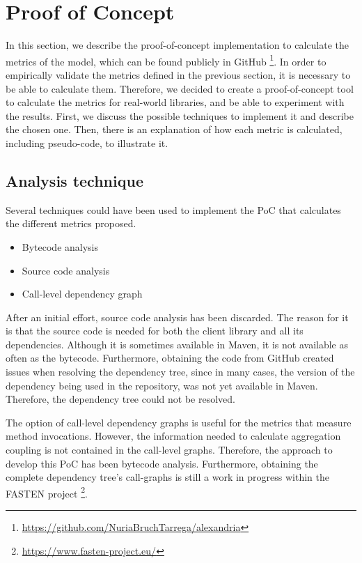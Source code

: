 \chapter{Proof of Concept}\label{ch:PoC}
In this section, we describe the proof-of-concept implementation to calculate the metrics of the model, which can be found publicly in GitHub \footnote{\url{https://github.com/NuriaBruchTarrega/alexandria}}. In order to empirically validate the metrics defined in the previous section, it is necessary to be able to calculate them. Therefore, we decided to create a proof-of-concept tool to calculate the metrics for real-world libraries, and be able to experiment with the results. First, we discuss the possible techniques to implement it and describe the chosen one. Then, there is an explanation of how each metric is calculated, including pseudo-code, to illustrate it.

\section{Analysis technique}
Several techniques could have been used to implement the PoC that calculates the different metrics proposed.

\begin{itemize}
  \item Bytecode analysis
  \item Source code analysis
  \item Call-level dependency graph
\end{itemize}

After an initial effort, source code analysis has been discarded. The reason for it is that the source code is needed for both the client library and all its dependencies. Although it is sometimes available in Maven, it is not available as often as the bytecode. Furthermore, obtaining the code from GitHub created issues when resolving the dependency tree, since in many cases, the version of the dependency being used in the repository, was not yet available in Maven. Therefore, the dependency tree could not be resolved.

The option of call-level dependency graphs is useful for the metrics that measure method invocations. However, the information needed to calculate aggregation coupling is not contained in the call-level graphs. Therefore, the approach to develop this PoC has been bytecode analysis. Furthermore, obtaining the complete dependency tree's call-graphs is still a work in progress within the FASTEN project \footnote{\url{https://www.fasten-project.eu/}}.

